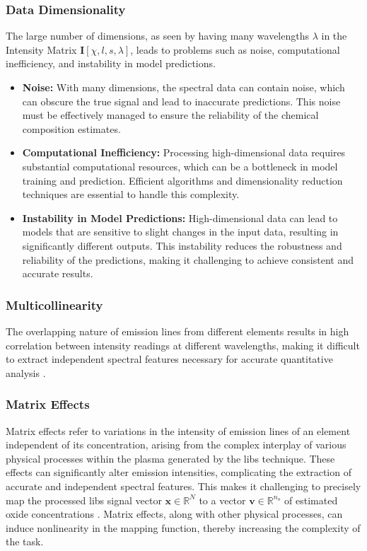 \subsubsection{Data Dimensionality}
The large number of dimensions, as seen by having many wavelengths $\lambda$ in the Intensity Matrix $\mathbf{I}[\chi, l, s, \lambda]$, leads to problems such as noise, computational inefficiency, and instability in model predictions.
\begin{itemize}
    \item \textbf{Noise:} With many dimensions, the spectral data can contain noise, which can obscure the true signal and lead to inaccurate predictions. This noise must be effectively managed to ensure the reliability of the chemical composition estimates.
    
    \item \textbf{Computational Inefficiency:} Processing high-dimensional data requires substantial computational resources, which can be a bottleneck in model training and prediction. Efficient algorithms and dimensionality reduction techniques are essential to handle this complexity.

    \item \textbf{Instability in Model Predictions:} High-dimensional data can lead to models that are sensitive to slight changes in the input data, resulting in significantly different outputs. This instability reduces the robustness and reliability of the predictions, making it challenging to achieve consistent and accurate results.
\end{itemize}

\subsubsection{Multicollinearity}
The overlapping nature of emission lines from different elements results in high correlation between intensity readings at different wavelengths, making it difficult to extract independent spectral features necessary for accurate quantitative analysis \cite{andersonImprovedAccuracyQuantitative2017}.

\subsubsection{Matrix Effects}
Matrix effects refer to variations in the intensity of emission lines of an element independent of its concentration, arising from the complex interplay of various physical processes within the plasma generated by the \gls{libs} technique. These effects can significantly alter emission intensities, complicating the extraction of accurate and independent spectral features. This makes it challenging to precisely map the processed \gls{libs} signal vector $\mathbf{x} \in \mathbb{R}^N$ to a vector $\mathbf{v} \in \mathbb{R}^{n_o}$ of estimated oxide concentrations \cite{cleggRecalibrationMarsScience2017, andersonImprovedAccuracyQuantitative2017}.
Matrix effects, along with other physical processes, can induce nonlinearity in the mapping function, thereby increasing the complexity of the task\cite{liuRecentAdvancesMachine2024}.

